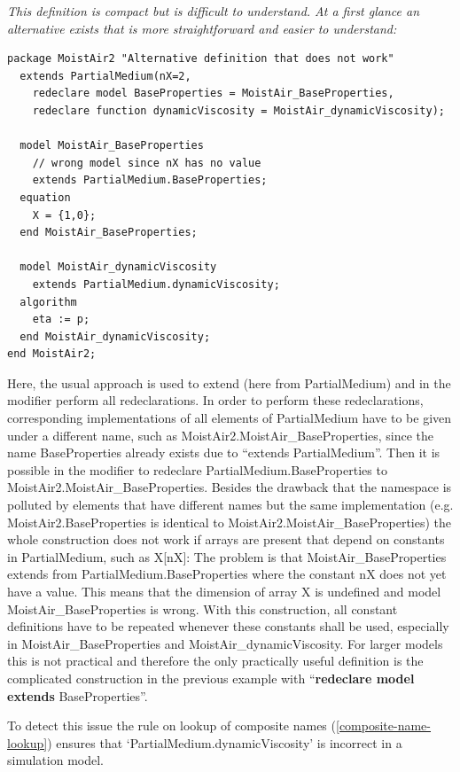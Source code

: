 \documentclass[10pt,a4paper]{report}
\begin{document}
\emph{This definition is compact but is difficult to understand. At a
first glance an alternative exists that is more straightforward and
easier to understand: }
\begin{lstlisting}[language=modelica]
package MoistAir2 "Alternative definition that does not work"
  extends PartialMedium(nX=2,
    redeclare model BaseProperties = MoistAir_BaseProperties,
    redeclare function dynamicViscosity = MoistAir_dynamicViscosity);
    
  model MoistAir_BaseProperties
    // wrong model since nX has no value
    extends PartialMedium.BaseProperties;
  equation 
    X = {1,0};
  end MoistAir_BaseProperties;

  model MoistAir_dynamicViscosity
    extends PartialMedium.dynamicViscosity;
  algorithm 
    eta := p;
  end MoistAir_dynamicViscosity;
end MoistAir2;
\end{lstlisting}

Here, the usual approach is used to extend (here from PartialMedium) and
in the modifier perform all redeclarations. In order to perform these
redeclarations, corresponding implementations of all elements of
PartialMedium have to be given under a different name, such as
MoistAir2.MoistAir\_BaseProperties, since the name BaseProperties
already exists due to ``extends PartialMedium''. Then it is possible in
the modifier to redeclare PartialMedium.BaseProperties to
MoistAir2.MoistAir\_BaseProperties. Besides the drawback that the
namespace is polluted by elements that have different names but the same
implementation (e.g. MoistAir2.BaseProperties is identical to
MoistAir2.MoistAir\_BaseProperties) the whole construction does not work
if arrays are present that depend on constants in PartialMedium, such as
  X{[}nX{]}: The problem is that MoistAir\_BaseProperties extends from
  PartialMedium.BaseProperties where the constant nX does not yet have a
  value. This means that the dimension of array X is undefined and model
  MoistAir\_BaseProperties is wrong. With this construction, all constant
definitions have to be repeated whenever these constants shall be used,
especially in MoistAir\_BaseProperties and MoistAir\_dynamicViscosity.
For larger models this is not practical and therefore the only
practically useful definition is the complicated construction in the
previous example with ``\textbf{redeclare model extends}
BaseProperties''.

To detect this issue the rule on lookup of composite names (\ref{composite-name-lookup}) 
ensures that `PartialMedium\allowbreak{}.dynamicViscosity' is incorrect in a
simulation model.
\end{document}
